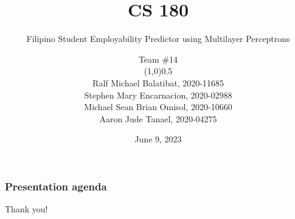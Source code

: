 \documentclass[11pt]{beamer}
\begin{document}
	\author[Team \#14]{
		Team \#14
		\begin{center}
   	 \line(1,0){0.5\linewidth}
		\end{center}
		{\scriptsize%
		Ralf Michael Balatibat, 2020-11685\\
		Stephen Mary Encarnacion, 2020-02988\\
		Michael Sean Brian Omisol, 2020-10660\\
		Aaron Jude Tanael, 2020-04275\\
		}
	}
	\title{CS 180}
	\subtitle{Filipino Student Employability Predictor using Multilayer Perceptrons}
	\date{June 9, 2023}

	\begin{frame}
		\maketitle
	\end{frame}
	
	\begin{frame}
	\frametitle{Presentation agenda}
	\tableofcontents
	\end{frame}

	
	
	
	

	\begin{frame}
	\begin{center}
	Thank you!
	\end{center}
	\end{frame}
\end{document}
